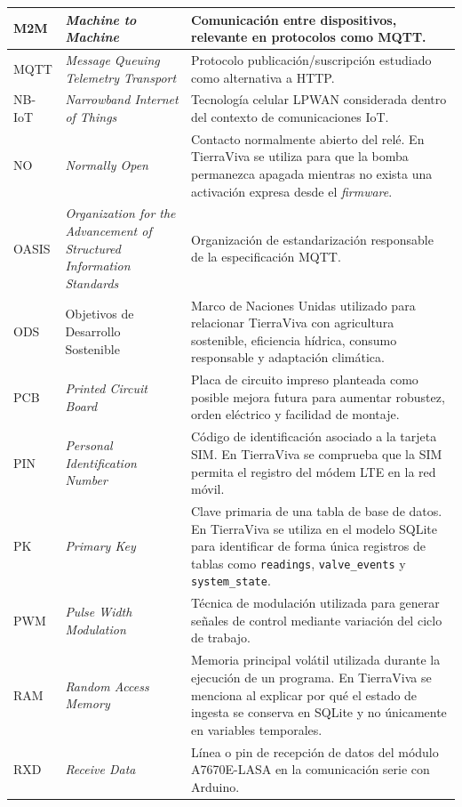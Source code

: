 \begin{longtable}{|p{}|p{}|p{}|}
\hline
M2M & \textit{Machine to Machine} & Comunicación entre dispositivos, relevante en protocolos como MQTT. \\
\hline
MQTT & \textit{Message Queuing Telemetry Transport} & Protocolo publicación/suscripción estudiado como alternativa a HTTP. \\
\hline
NB-IoT & \textit{Narrowband Internet of Things} & Tecnología celular LPWAN considerada dentro del contexto de comunicaciones IoT. \\
\hline
NO & \textit{Normally Open} & Contacto normalmente abierto del relé. En TierraViva se utiliza para que la bomba permanezca apagada mientras no exista una activación expresa desde el \textit{firmware}. \\
\hline
OASIS & \textit{Organization for the Advancement of Structured Information Standards} & Organización de estandarización responsable de la especificación MQTT. \\
\hline
ODS & Objetivos de Desarrollo Sostenible & Marco de Naciones Unidas utilizado para relacionar TierraViva con agricultura sostenible, eficiencia hídrica, consumo responsable y adaptación climática. \\
\hline
PCB & \textit{Printed Circuit Board} & Placa de circuito impreso planteada como posible mejora futura para aumentar robustez, orden eléctrico y facilidad de montaje. \\
\hline
PIN & \textit{Personal Identification Number} & Código de identificación asociado a la tarjeta SIM. En TierraViva se comprueba que la SIM permita el registro del módem LTE en la red móvil. \\
\hline
PK & \textit{Primary Key} & Clave primaria de una tabla de base de datos. En TierraViva se utiliza en el modelo SQLite para identificar de forma única registros de tablas como \texttt{readings}, \texttt{valve\_events} y \texttt{system\_state}. \\
\hline
PWM & \textit{Pulse Width Modulation} & Técnica de modulación utilizada para generar señales de control mediante variación del ciclo de trabajo. \\
\hline
RAM & \textit{Random Access Memory} & Memoria principal volátil utilizada durante la ejecución de un programa. En TierraViva se menciona al explicar por qué el estado de ingesta se conserva en SQLite y no únicamente en variables temporales. \\
\hline
RXD & \textit{Receive Data} & Línea o pin de recepción de datos del módulo A7670E-LASA en la comunicación serie con Arduino. \\

\end{longtable}

